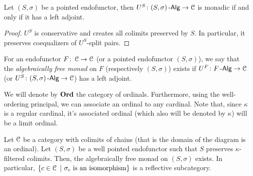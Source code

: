 \documentclass[a4paper,11pt,oneside,openany]{scrbook}
\begin{document}
\begin{lemma}
	Let $(S,\sigma)$ be a pointed endofunctor, then $U^S\colon(S,\sigma)\operatorname{-\mathsf{Alg}}\to\operatorname{\mathcal{C}}$ is monadic if and only if it has a left adjoint.
\end{lemma}
\begin{proof}
	$U^S$ is conservative and creates all colimits preserved by $S$. In particular, it preserves coequalizers of $U^S$-split pairs.
\end{proof}
\begin{defn}
	For an endofunctor $F\colon\operatorname{\mathcal{C}}\to\operatorname{\mathcal{C}}$ (or a pointed endofunctor $(S,\sigma)$), we say that the \emph{algebraically free monad} on $F$ (respectively  $(S,\sigma)$) exists if $U^F\colon F\operatorname{-\mathsf{Alg}}\to\operatorname{\mathcal{C}}$ (or $U^S\colon(S,\sigma)\operatorname{-\mathsf{Alg}}\to\operatorname{\mathcal{C}}$) has a left adjoint.
\end{defn}

We will denote by $\operatorname{\mathbf{Ord}}$ the category of ordinals. Furthermore, using
the well-ordering principal, we can associate an ordinal to any cardinal.
Note that, since $\kappa$ is a regular cardinal, it's associated ordinal
(which also will be denoted by $\kappa$) will be a limit ordinal.

\begin{thm}
	Let $\operatorname{\mathcal{C}}$ be a category with colimits of chains (that is the domain of the diagram is an ordinal). Let $(S,\sigma)$ be a well pointed endofunctor such that $S$ preserves $\kappa$-filtered colimits. Then, the algebraically free monad on $(S,\sigma)$ exists. In particular, $\{c\in\C\ |\ \sigma_c\text{ is an isomorphism}\}$ is a reflective subcategory.
\end{thm}
\end{document}

